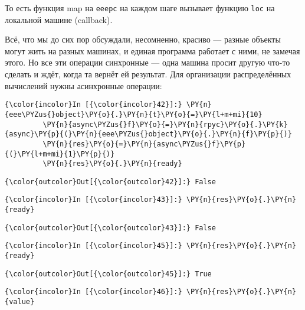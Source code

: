     То есть функция map на \texttt{eeepc} на каждом шаге вызывает функцию
\texttt{loc} на локальной машине (callback).

Всё, что мы до сих пор обсуждали, несомненно, красиво --- разные объекты
могут жить на разных машинах, и единая программа работает с ними, не
замечая этого. Но все эти операции синхронные --- одна машина просит
другую что-то сделать и ждёт, когда та вернёт ей результат. Для
организации распределённых вычислений нужны асинхронные операции:

    \begin{Verbatim}[commandchars=\\\{\}]
{\color{incolor}In [{\color{incolor}42}]:} \PY{n}{eee\PYZus{}object}\PY{o}{.}\PY{n}{t}\PY{o}{=}\PY{l+m+mi}{10}
         \PY{n}{async\PYZus{}f}\PY{o}{=}\PY{n}{rpyc}\PY{o}{.}\PY{k}{async}\PY{p}{(}\PY{n}{eee\PYZus{}object}\PY{o}{.}\PY{n}{f}\PY{p}{)}
         \PY{n}{res}\PY{o}{=}\PY{n}{async\PYZus{}f}\PY{p}{(}\PY{l+m+mi}{1}\PY{p}{)}
         \PY{n}{res}\PY{o}{.}\PY{n}{ready}
\end{Verbatim}


\begin{Verbatim}[commandchars=\\\{\}]
{\color{outcolor}Out[{\color{outcolor}42}]:} False
\end{Verbatim}
            
    \begin{Verbatim}[commandchars=\\\{\}]
{\color{incolor}In [{\color{incolor}43}]:} \PY{n}{res}\PY{o}{.}\PY{n}{ready}
\end{Verbatim}


\begin{Verbatim}[commandchars=\\\{\}]
{\color{outcolor}Out[{\color{outcolor}43}]:} False
\end{Verbatim}
            
    \begin{Verbatim}[commandchars=\\\{\}]
{\color{incolor}In [{\color{incolor}45}]:} \PY{n}{res}\PY{o}{.}\PY{n}{ready}
\end{Verbatim}


\begin{Verbatim}[commandchars=\\\{\}]
{\color{outcolor}Out[{\color{outcolor}45}]:} True
\end{Verbatim}
            
    \begin{Verbatim}[commandchars=\\\{\}]
{\color{incolor}In [{\color{incolor}46}]:} \PY{n}{res}\PY{o}{.}\PY{n}{value}
\end{Verbatim}


